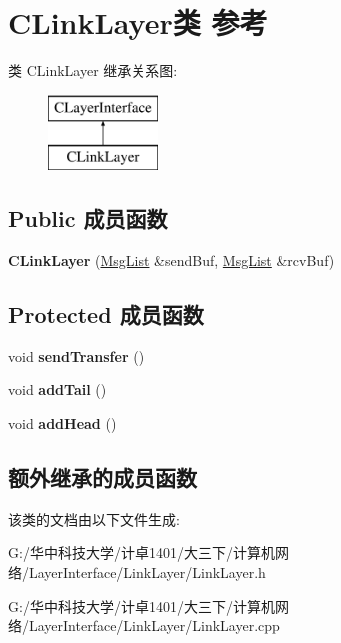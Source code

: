 \hypertarget{class_c_link_layer}{}\section{C\+Link\+Layer类 参考}
\label{class_c_link_layer}
类 C\+Link\+Layer 继承关系图\+:\begin{figure}[H]
\begin{center}
\leavevmode
\includegraphics[height=2.000000cm]{class_c_link_layer}
\end{center}
\end{figure}
\subsection*{Public 成员函数}
\begin{DoxyCompactItemize}
\item 
\mbox{\label{class_c_link_layer_a74cefcec9517de56f587fb26d646d610}} 
{\bfseries C\+Link\+Layer} (\hyperlink{class_msg_list}{Msg\+List} \&send\+Buf, \hyperlink{class_msg_list}{Msg\+List} \&rcv\+Buf)
\end{DoxyCompactItemize}
\subsection*{Protected 成员函数}
\begin{DoxyCompactItemize}
\item 
\mbox{\label{class_c_link_layer_ab6a4124af45069fefeddff784ea26e3f}} 
void {\bfseries send\+Transfer} ()
\item 
\mbox{\label{class_c_link_layer_a0962e4887e1893721031309a1e49a638}} 
void {\bfseries add\+Tail} ()
\item 
\mbox{\label{class_c_link_layer_a6ef143071b324acea3cd11ef86ba850f}} 
void {\bfseries add\+Head} ()
\end{DoxyCompactItemize}
\subsection*{额外继承的成员函数}


该类的文档由以下文件生成\+:\begin{DoxyCompactItemize}
\item 
G\+:/华中科技大学/计卓1401/大三下/计算机网络/\+Layer\+Interface/\+Link\+Layer/Link\+Layer.\+h\item 
G\+:/华中科技大学/计卓1401/大三下/计算机网络/\+Layer\+Interface/\+Link\+Layer/Link\+Layer.\+cpp\end{DoxyCompactItemize}
